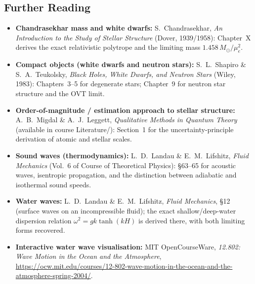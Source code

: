 \subsection*{Further Reading}
\label{sec:lec10:further-reading}

\begin{itemize}
    \item \textbf{Chandrasekhar mass and white dwarfs:}
    S.\ Chandrasekhar, \textit{An Introduction to the Study of Stellar Structure}
    (Dover, 1939/1958): Chapter~X derives the exact relativistic polytrope and the
    limiting mass $1.458\,M_\odot/\mu_e^2$.

    \item \textbf{Compact objects (white dwarfs and neutron stars):}
    S.\ L.\ Shapiro \& S.\ A.\ Teukolsky, \textit{Black Holes, White Dwarfs, and
    Neutron Stars} (Wiley, 1983): Chapters~3--5 for degenerate stars; Chapter~9 for
    neutron star structure and the OVT limit.

    \item \textbf{Order-of-magnitude / estimation approach to stellar structure:}
    A.\ B.\ Migdal \& A.\ J.\ Leggett, \textit{Qualitative Methods in Quantum
    Theory} (available in course Literature/): Section~1 for the uncertainty-principle
    derivation of atomic and stellar scales.

    \item \textbf{Sound waves (thermodynamics):}
    L.\ D.\ Landau \& E.\ M.\ Lifshitz, \textit{Fluid Mechanics} (Vol.~6 of Course
    of Theoretical Physics): §63--65 for acoustic waves, isentropic propagation,
    and the distinction between adiabatic and isothermal sound speeds.

    \item \textbf{Water waves:}
    L.\ D.\ Landau \& E.\ M.\ Lifshitz, \textit{Fluid Mechanics}, §12 (surface
    waves on an incompressible fluid); the exact shallow/deep-water dispersion
    relation $\omega^2 = gk\tanh(kH)$ is derived there, with both limiting forms
    recovered.

    \item \textbf{Interactive water wave visualisation:}
    MIT OpenCourseWare, \textit{12.802: Wave Motion in the Ocean and the Atmosphere},
    \url{https://ocw.mit.edu/courses/12-802-wave-motion-in-the-ocean-and-the-atmosphere-spring-2004/}.
\end{itemize}
